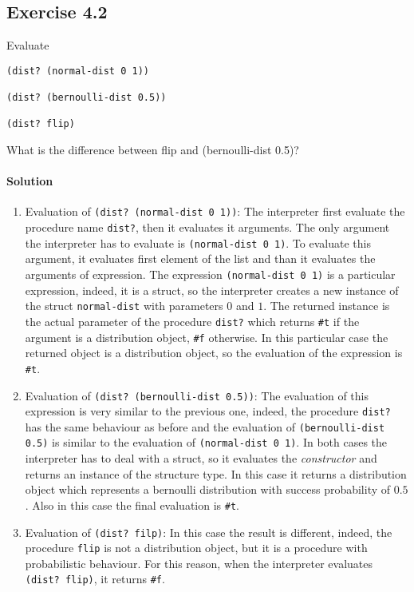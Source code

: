 \subsection*{Exercise 4.2}
Evaluate
\begin{lstlisting}
(dist? (normal-dist 0 1))
    
(dist? (bernoulli-dist 0.5))

(dist? flip)
\end{lstlisting}
What is the difference between flip and (bernoulli-dist 0.5)?

\paragraph{Solution}
\begin{enumerate}
    \item Evaluation of \texttt{(dist? (normal-dist 0 1))}: The interpreter first evaluate the procedure name \texttt{dist?}, then
        it evaluates it arguments. The only argument the interpreter has to evaluate is \texttt{(normal-dist 0 1)}. To evaluate
        this argument, it evaluates first element of the list and than it evaluates the arguments of expression.
        The expression \texttt{(normal-dist 0 1)} is a particular expression, indeed, it is a struct, so the interpreter creates a
        new instance of the struct \texttt{normal-dist} with parameters $0$ and $1$. The returned instance is the actual parameter
        of the procedure \texttt{dist?} which returns \texttt{\#t} if the argument is a distribution object, \texttt{\#f}
        otherwise. In this particular case the returned object is a distribution object, so the evaluation of the expression is 
        \texttt{\#t}.
    \item Evaluation of \texttt{(dist? (bernoulli-dist 0.5))}: The evaluation of this expression is very similar to the previous
        one, indeed, the procedure \texttt{dist?} has the same behaviour as before and the evaluation of \texttt{(bernoulli-dist 0.5)}
        is similar to the evaluation of \texttt{(normal-dist 0 1)}.
        In both cases the interpreter has to deal with a struct, so it evaluates the \textit{constructor} and returns an instance
        of the structure type. In this case it returns a distribution object which represents a bernoulli distribution with success
        probability of $0.5$.
        Also in this case the final evaluation is \texttt{\#t}.
    \item Evaluation of \texttt{(dist? filp)}: In this case the result is different, indeed, the procedure \texttt{flip} is not a 
        distribution object, but it is a procedure with probabilistic behaviour. For this reason, when the interpreter evaluates
        \texttt{(dist? flip)}, it returns \texttt{\#f}.
\end{enumerate}

